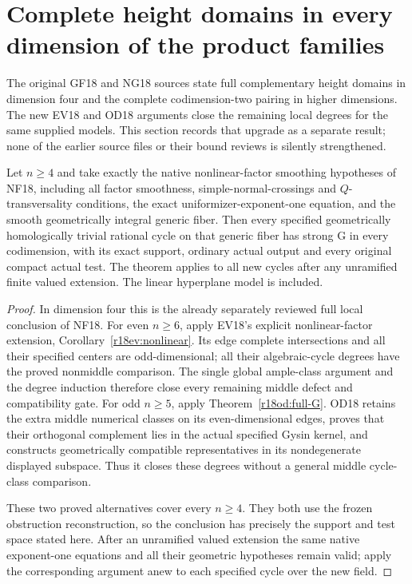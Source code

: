 \section{Complete height domains in every dimension of the product families}
\label{r18gh:section}

The original GF18 and NG18 sources state full complementary
height domains in dimension four and the complete
codimension-two pairing in higher dimensions.  The
new EV18 and OD18 arguments close the remaining local
degrees for the same supplied models.  This section
records that upgrade as a separate result; none of
the earlier source files or their bound reviews is
silently strengthened.

\begin{theorem}
\label{r18gh:local}
Let $n\ge4$ and take exactly the native nonlinear-factor
smoothing hypotheses of NF18, including all factor
smoothness, simple-normal-crossings and $Q$-transversality
conditions, the exact uniformizer-exponent-one equation,
and the smooth geometrically integral generic fiber.
Then every specified geometrically homologically trivial
rational cycle on that generic fiber has strong G in
every codimension, with its exact support, ordinary
actual output and every original compact actual test.
The theorem applies to all new cycles after any
unramified finite valued extension.
The linear hyperplane model is included.
\end{theorem}

\begin{proof}
In dimension four this is the already separately
reviewed full local conclusion of NF18.
For even $n\ge6$, apply EV18's explicit nonlinear-factor
extension, Corollary~\ref{r18ev:nonlinear}.  Its edge
complete intersections and all their specified centers
are odd-dimensional; all their algebraic-cycle degrees
have the proved nonmiddle comparison.  The single
global ample-class argument and the degree induction
therefore close every remaining middle defect and
compatibility gate.
For odd $n\ge5$, apply
Theorem~\ref{r18od:full-G}.  OD18 retains the extra
middle numerical classes on its even-dimensional
edges, proves that their orthogonal complement lies
in the actual specified Gysin kernel, and constructs
geometrically compatible representatives in its
nondegenerate displayed subspace.  Thus it closes
these degrees without a general middle cycle-class
comparison.

These two proved alternatives cover every $n\ge4$.
They both use the frozen obstruction reconstruction,
so the conclusion has precisely the support and
test space stated here.  After an unramified valued
extension the same native exponent-one equations
and all their geometric hypotheses remain valid;
apply the corresponding argument anew to each
specified cycle over the new field.
\end{proof}

